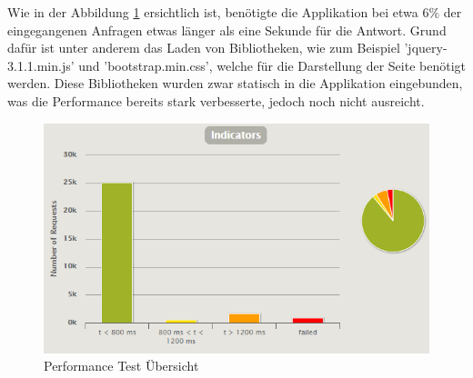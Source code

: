 Wie in der Abbildung \ref{performance_tests} ersichtlich ist, benötigte die Applikation bei etwa 6\% der eingegangenen Anfragen etwas länger als eine Sekunde für die Antwort. Grund dafür ist unter anderem das Laden von Bibliotheken, wie zum Beispiel 'jquery-3.1.1.min.js' und 'bootstrap.min.css', welche für die Darstellung der Seite benötigt werden. Diese Bibliotheken wurden zwar statisch in die Applikation eingebunden, was die Performance bereits stark verbesserte, jedoch noch nicht ausreicht. 

	\begin{figure}[H]
		\includegraphics[width=\textwidth, height=\textheight, keepaspectratio]{images/performance_uebersicht.png}
		\caption{Performance Test Übersicht}
		\label{performance_tests}
	\end{figure}


